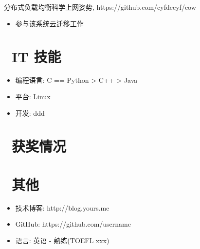 \documentclass{resume}
\begin{document}
\begin{onehalfspacing}
分布式负载均衡科学上网姿势, https://github.com/cyfdecyf/cow
\begin{itemize}
  \item 参与该系统云迁移工作
\end{itemize}
\end{onehalfspacing}


\section{\faCogs\ IT 技能}
\begin{itemize}[parsep=0.5ex]
  \item 编程语言: C == Python > C++ > Java
  \item 平台: Linux
  \item 开发: ddd
\end{itemize}

\section{\faHeartO\ 获奖情况}

\section{\faInfo\ 其他}
\begin{itemize}[parsep=0.5ex]
  \item 技术博客: http://blog.yours.me
  \item GitHub: https://github.com/username
  \item 语言: 英语 - 熟练(TOEFL xxx)
\end{itemize}

%
%
\end{document}
